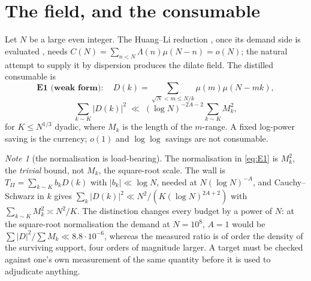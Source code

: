 \documentclass[11pt,a4paper]{article}
\theoremstyle{plain}
\theoremstyle{definition}
\theoremstyle{remark}
\newtheorem{note}[theorem]{Note}
\begin{document}
\section{The field, and the consumable}

Let $N$ be a large even integer. The Huang--Li reduction \cite{HL},
once its demand side is evaluated \cite{P1}, needs
$C(N)=\sum_{n<N}\Lambda(n)\mu(N-n)=o(N)$; the natural attempt to
supply it by dispersion produces the dilate field. The distilled
consumable is
\begin{equation}\label{eq:E1}
  \textbf{E1 (weak form)}:\quad
  D(k)=\!\!\sum_{\sqrt N<m\le N/k}\!\!\mu(m)\mu(N-mk),
\end{equation}
\[
  \sum_{k\sim K}|D(k)|^2\;\ll\;(\log N)^{-2A-2}\sum_{k\sim K}M_k^2,
\]
for $K\le N^{1/3}$ dyadic, where $M_k$ is the length of the
$m$-range. A fixed log-power saving is the currency; $o(1)$ and
$\log\log$ savings are not consumable.

\begin{note}[the normalisation is load-bearing]\label{note:scale}
The normalisation in \eqref{eq:E1} is $M_k^2$, the \emph{trivial}
bound, not $M_k$, the square-root scale. The wall is
$T_{II}=\sum_{k\sim K}b_kD(k)$ with $|b_k|\ll\log N$, needed at
$N(\log N)^{-A}$, and Cauchy--Schwarz in $k$ gives
$\sum_k|D(k)|^2\ll N^2/(K(\log N)^{2A+2})$ with
$\sum_{k\sim K}M_k^2\asymp N^2/K$. The distinction changes every
budget by a power of $N$: at the square-root normalisation the demand
at $N=10^8$, $A=1$ would be $\sum|D|^2/\sum M_k\ll8.8\cdot10^{-6}$,
whereas the measured ratio is of order the density of the surviving
support, four orders of magnitude larger. A target must be checked
against one's own measurement of the same quantity before it is used
to adjudicate anything.
\end{note}
\end{document}
